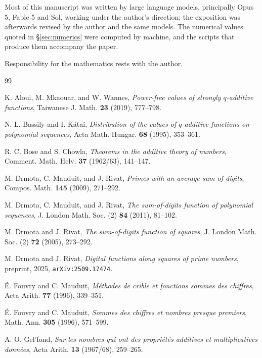 \documentclass[11pt,reqno]{amsart}
\theoremstyle{plain}
\theoremstyle{definition}
\begin{document}
Most of this manuscript was written by large language models, principally Opus 5,
Fable 5 and Sol, working under the author's direction; the exposition was afterwards
revised by the author and the same models. The numerical values quoted in
\S\ref{sec:numerics} were computed by machine, and the scripts that produce them
accompany the paper.

Responsibility for the mathematics rests with the author.

\begin{thebibliography}{99}

 K. Aloui, M. Mkaouar, and W. Wannes, \emph{Power-free values of strongly $q$-additive functions}, Taiwanese J. Math. \textbf{23} (2019), 777--798.

 N. L. Bassily and I. K\'atai, \emph{Distribution of the values of $q$-additive functions on polynomial sequences}, Acta Math. Hungar. \textbf{68} (1995), 353--361.

 R. C. Bose and S. Chowla, \emph{Theorems in the additive theory of numbers}, Comment. Math. Helv. \textbf{37} (1962/63), 141--147.

 M. Drmota, C. Mauduit, and J. Rivat, \emph{Primes with an average sum of digits}, Compos. Math. \textbf{145} (2009), 271--292.

 M. Drmota, C. Mauduit, and J. Rivat, \emph{The sum-of-digits function of polynomial sequences}, J. London Math. Soc. (2) \textbf{84} (2011), 81--102.

 M. Drmota and J. Rivat, \emph{The sum-of-digits function of squares}, J. London Math. Soc. (2) \textbf{72} (2005), 273--292.

 M. Drmota and J. Rivat, \emph{Digital functions along squares of prime numbers}, preprint, 2025, \texttt{arXiv:2509.17474}.

 \'E. Fouvry and C. Mauduit, \emph{M\'ethodes de crible et fonctions sommes des chiffres}, Acta Arith. \textbf{77} (1996), 339--351.

 \'E. Fouvry and C. Mauduit, \emph{Sommes des chiffres et nombres presque premiers}, Math. Ann. \textbf{305} (1996), 571--599.

 A. O. Gel'fond, \emph{Sur les nombres qui ont des propri\'et\'es additives et multiplicatives donn\'ees}, Acta Arith. \textbf{13} (1967/68), 259--265.


\end{thebibliography}
\end{document}
